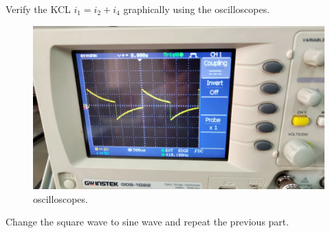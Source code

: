 \documentclass[11pt]{article}
\begin{document}
\begin{question}
\begin{subquestion}{Verify the KCL $i_1=i_2+i_4$ graphically using the oscilloscopes.}
{\begin{figure}[H]
                \includegraphics[scale=0.1,angle=0]{Fig/17.jpeg}
                \caption{oscilloscopes.}
            \end{figure}
        }
    \end{subquestion}

    \begin{subquestion}{Change the square wave to sine wave and repeat the previous part.}
    \end{subquestion}


\end{question}
\end{document}
